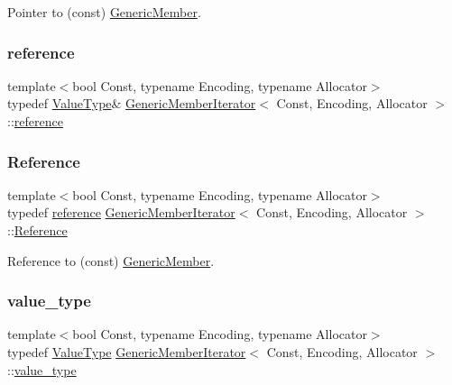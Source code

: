 Pointer to (const) \hyperlink{classGenericMember}{Generic\+Member}. 

\mbox{\label{classGenericMemberIterator_a182876d698903331bd0b11db6d1beeca}} 
\subsubsection{\texorpdfstring{reference}{reference}}
{\footnotesize\ttfamily template$<$bool Const, typename Encoding, typename Allocator$>$ \\
typedef \hyperlink{classGenericMemberIterator_a1323c9d064a9c388a1eb62a6e2c17584}{Value\+Type}\& \hyperlink{classGenericMemberIterator}{Generic\+Member\+Iterator}$<$ Const, Encoding, Allocator $>$\+::\hyperlink{classGenericMemberIterator_a182876d698903331bd0b11db6d1beeca}{reference}}

\mbox{\label{classGenericMemberIterator_a8042a85a9e233d65de5b6c66d9a1109a}} 
\subsubsection{\texorpdfstring{Reference}{Reference}}
{\footnotesize\ttfamily template$<$bool Const, typename Encoding, typename Allocator$>$ \\
typedef \hyperlink{classGenericMemberIterator_a182876d698903331bd0b11db6d1beeca}{reference} \hyperlink{classGenericMemberIterator}{Generic\+Member\+Iterator}$<$ Const, Encoding, Allocator $>$\+::\hyperlink{classGenericMemberIterator_a8042a85a9e233d65de5b6c66d9a1109a}{Reference}}



Reference to (const) \hyperlink{classGenericMember}{Generic\+Member}. 

\mbox{\label{classGenericMemberIterator_a79326e02032d06d80e09ded797501553}} 
\subsubsection{\texorpdfstring{value\+\_\+type}{value\_type}}
{\footnotesize\ttfamily template$<$bool Const, typename Encoding, typename Allocator$>$ \\
typedef \hyperlink{classGenericMemberIterator_a1323c9d064a9c388a1eb62a6e2c17584}{Value\+Type} \hyperlink{classGenericMemberIterator}{Generic\+Member\+Iterator}$<$ Const, Encoding, Allocator $>$\+::\hyperlink{classGenericMemberIterator_a79326e02032d06d80e09ded797501553}{value\+\_\+type}}

